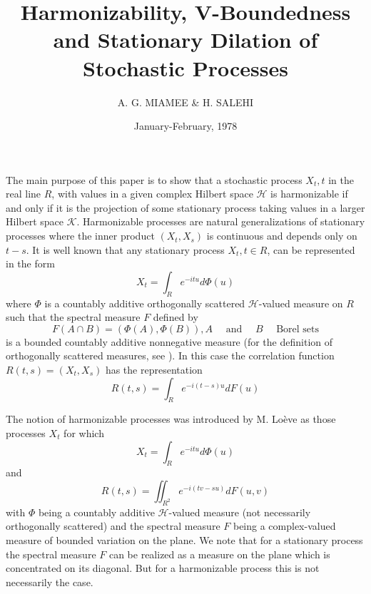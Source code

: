 \documentclass{article}
\title{Harmonizability, V-Boundedness and Stationary Dilation of Stochastic Processes}
\author{A. G. MIAMEE \& H. SALEHI}
\date{January-February, 1978}
\begin{document}
\maketitle

The main purpose of this paper is to show that a stochastic process $X_{t}, t$ in the real line $R$, with values in a given complex Hilbert space $\mathscr{H}$ is harmonizable if and only if it is the projection of some stationary process taking values in a larger Hilbert space $\mathscr{K}$. Harmonizable processes are natural generalizations of stationary processes where the inner product $(X_{t}, X_{s})$ is continuous and depends only on $t-s$. It is well known that any stationary process $X_{t}, t \in R$, can be represented in the form
\begin{equation}
X_{t}=\int_{R} e^{-i t u} d \Phi(u)
\end{equation}
where $\Phi$ is a countably additive orthogonally scattered $\mathscr{H}$-valued measure on $R$ such that the spectral measure $F$ defined by
\begin{equation}
F(A \cap B)=(\Phi(A), \Phi(B)), A \quad \text{ and } \quad B \quad \text{ Borel sets}
\end{equation}
is a bounded countably additive nonnegative measure (for the definition of orthogonally scattered measures, see \cite{masani}). In this case the correlation function $R(t, s)=(X_{t}, X_{s})$ has the representation
\begin{equation}
R(t, s)=\int_{R} e^{-i(t-s) u} d F(u)
\end{equation}

The notion of harmonizable processes was introduced by M. Loève \cite{loeve} as those processes $X_{t}$ for which
\begin{equation}
X_{t}=\int_{R} e^{-i t u} d \Phi(u)
\end{equation}
and
\begin{equation}
R(t, s)=\iint_{R^{2}} e^{-i(t v-s u)} d F(u, v)
\end{equation}
with $\Phi$ being a countably additive $\mathscr{H}$-valued measure (not necessarily orthogonally scattered) and the spectral measure $F$ being a complex-valued measure of
bounded variation on the plane. We note that for a stationary process the spectral measure $F$ can be realized as a measure on the plane which is concentrated on its diagonal. But for a harmonizable process this is not necessarily the case.
\end{document}
